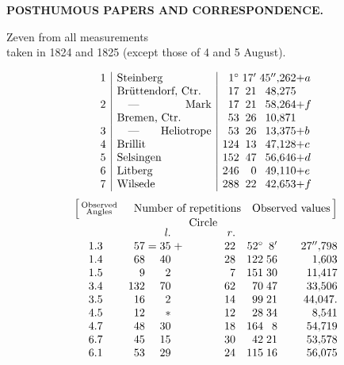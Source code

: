 \par\clearpage
\null\thispagestyle{empty}

\par\clearpage
\thispagestyle{empty}
\vspace*{2.8\baselineskip}
{\centering\Large\bfseries POSTHUMOUS PAPERS AND CORRESPONDENCE.\par}
\vspace{3.3\baselineskip}
{\centering
[1.]\par{} Zeven from all measurements\\
taken in 1824 and 1825 (except those of 4 and 5 August).\par{}\par}
\[
\begin{array}{@{}r|l|r@{\;}r@{\;}r@{}l@{}}
 1&\text{Steinberg}&1^\circ&17'&45''{,}262&+a\\
 &\text{Brüttendorf, Ctr.}&17&21&48{,}275&\\
 2&\text{\hbox to 8.5em{\quad—\hfil Mark}}&17&21&58{,}264&+f\\
 &\text{Bremen, Ctr.}&53&26&10{,}871&\\
 3&\text{\hbox to 8.5em{\quad—\hfil Heliotrope}}&53&26&13{,}375&+b\\
 4&\text{Brillit}&124&13&47{,}128&+c\\
 5&\text{Selsingen}&152&47&56{,}646&+d\\
 6&\text{Litberg}&246&0&49{,}110&+e\\
 7&\text{Wilsede}&288&22&42{,}653&+f
\end{array}
\]
{\small
\[
\begin{array}{@{}c@{\quad}r@{\;}c@{\;}r@{\;}c@{\;}r@{\quad}r@{\;}r@{\;}r@{}}
 \Bigl[\,\substack{\text{Observed}\\\text{Angles}}&
 \multicolumn{5}{c}{\text{Number of repetitions}}&
 \multicolumn{3}{c@{}}{\text{Observed values}\,\Bigr]}\\[-2pt]
 &&&\multicolumn{3}{c}{\text{Circle}}&&&\\[-3pt]
 &&&\mathit{l.}&&\mathit{r.}&&&\\
 1.3&57&=&35&+&22&52^\circ&8'&27''{,}798\\
 1.4&68&&40&&28&122&56&1{,}603\\
 1.5&9&&2&&7&151&30&11{,}417\\
 3.4&132&&70&&62&70&47&33{,}506\\
 3.5&16&&2&&14&99&21&44{,}047.\\
 4.5&12&&\ast&&12&28&34&8{,}541\\
 4.7&48&&30&&18&164&8&54{,}719\\
 6.7&45&&15&&30&42&21&53{,}578\\
 6.1&53&&29&&24&115&16&56{,}075
\end{array}
\]
}

